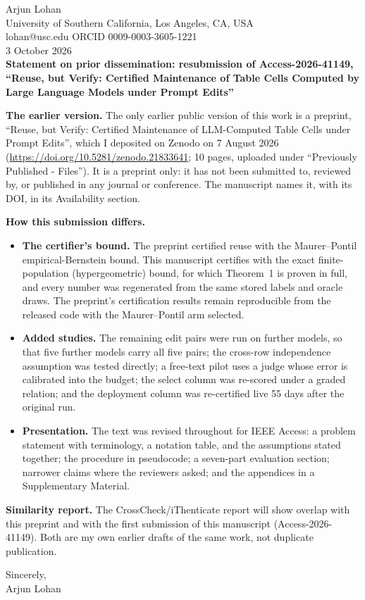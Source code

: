 \documentclass[10.5pt]{article}
\begin{document}
Arjun Lohan\\
University of Southern California, Los Angeles, CA, USA\\
lohan@usc.edu \quad ORCID 0009-0003-3605-1221\\[0.4em]
3 October 2026\\[0.8em]
\textbf{Statement on prior dissemination: resubmission of Access-2026-41149, ``Reuse, but Verify: Certified Maintenance of Table Cells Computed by Large Language Models under Prompt Edits''}

\textbf{The earlier version.} The only earlier public version of this work is a preprint, ``Reuse, but Verify: Certified Maintenance of LLM-Computed Table Cells under Prompt Edits'', which I deposited on Zenodo on 7 August 2026 (\url{https://doi.org/10.5281/zenodo.21833641}; 10 pages, uploaded under ``Previously Published - Files''). It is a preprint only: it has not been submitted to, reviewed by, or published in any journal or conference. The manuscript names it, with its DOI, in its Availability section.

\textbf{How this submission differs.}
\begin{itemize}
\item \textbf{The certifier's bound.} The preprint certified reuse with the Maurer--Pontil empirical-Bernstein bound. This manuscript certifies with the exact finite-population (hypergeometric) bound, for which Theorem~1 is proven in full, and every number was regenerated from the same stored labels and oracle draws. The preprint's certification results remain reproducible from the released code with the Maurer--Pontil arm selected.
\item \textbf{Added studies.} The remaining edit pairs were run on further models, so that five further models carry all five pairs; the cross-row independence assumption was tested directly; a free-text pilot uses a judge whose error is calibrated into the budget; the select column was re-scored under a graded relation; and the deployment column was re-certified live 55 days after the original run.
\item \textbf{Presentation.} The text was revised throughout for IEEE Access: a problem statement with terminology, a notation table, and the assumptions stated together; the procedure in pseudocode; a seven-part evaluation section; narrower claims where the reviewers asked; and the appendices in a Supplementary Material.
\end{itemize}

\textbf{Similarity report.} The CrossCheck/iThenticate report will show overlap with this preprint and with the first submission of this manuscript (Access-2026-41149). Both are my own earlier drafts of the same work, not duplicate publication.

Sincerely,\\[0.3em]
Arjun Lohan
\end{document}
